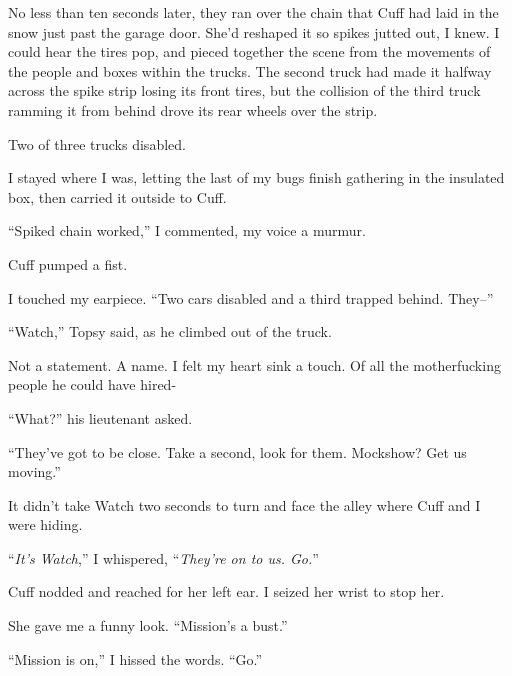 No less than ten seconds later, they ran over the chain that Cuff had laid in the snow just past the garage door.  She'd reshaped it so spikes jutted out, I knew.  I could hear the tires pop, and pieced together the scene from the movements of the people and boxes within the trucks.  The second truck had made it halfway across the spike strip losing its front tires, but the collision of the third truck ramming it from behind drove its rear wheels over the strip.



Two of three trucks disabled.



I stayed where I was, letting the last of my bugs finish gathering in the insulated box, then carried it outside to Cuff.



``Spiked chain worked,'' I commented, my voice a murmur.



Cuff pumped a fist.



I touched my earpiece.  ``Two cars disabled and a third trapped behind.  They--''



``Watch,'' Topsy said, as he climbed out of the truck.



Not a statement.  A name.  I felt my heart sink a touch.  Of all the motherfucking people he could have hired-



``What?'' his lieutenant asked.



``They've got to be close.  Take a second, look for them.  Mockshow?  Get us moving.''



It didn't take Watch two seconds to turn and face the alley where Cuff and I were hiding.



``\emph{It's Watch},'' I whispered, ``\emph{They're on to us.  Go.}''



Cuff nodded and reached for her left ear.  I seized her wrist to stop her.



She gave me a funny look.  ``Mission's a bust.''



``Mission is on,'' I hissed the words.  ``Go.''



